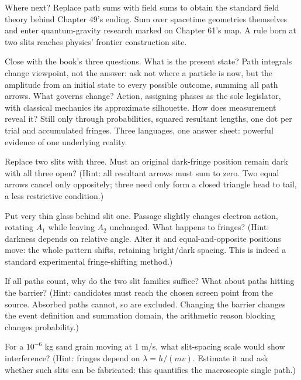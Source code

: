 Where next? Replace path sums with field sums to obtain the standard field theory behind Chapter 49's ending. Sum over spacetime geometries themselves and enter quantum-gravity research marked on Chapter 61's map. A rule born at two slits reaches physics' frontier construction site.

Close with the book's three questions. What is the present state? Path integrals change viewpoint, not the answer: ask not where a particle is now, but the amplitude from an initial state to every possible outcome, summing all path arrows. What governs change? Action, assigning phases as the sole legislator, with classical mechanics its approximate silhouette. How does measurement reveal it? Still only through probabilities, squared resultant lengths, one dot per trial and accumulated fringes. Three languages, one answer sheet: powerful evidence of one underlying reality.

\begin{puzzles}
\item Replace two slits with three. Must an original dark-fringe position remain dark with all three open? (Hint: all resultant arrows must sum to zero. Two equal arrows cancel only oppositely; three need only form a closed triangle head to tail, a less restrictive condition.)
\item Put very thin glass behind slit one. Passage slightly changes electron action, rotating \(A_1\) while leaving \(A_2\) unchanged. What happens to fringes? (Hint: darkness depends on relative angle. Alter it and equal-and-opposite positions move: the whole pattern shifts, retaining bright/dark spacing. This is indeed a standard experimental fringe-shifting method.)
\item If all paths count, why do the two slit families suffice? What about paths hitting the barrier? (Hint: candidates must reach the chosen screen point from the source. Absorbed paths cannot, so are excluded. Changing the barrier changes the event definition and summation domain, the arithmetic reason blocking changes probability.)
\item For a \(10^{-6}\) kg sand grain moving at 1 m/s, what slit-spacing scale would show interference? (Hint: fringes depend on \(\lambda=h/(mv)\). Estimate it and ask whether such slits can be fabricated: this quantifies the macroscopic single path.)
\end{puzzles}
